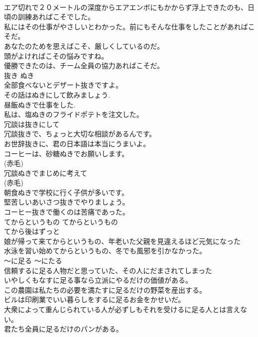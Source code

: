 \documentclass[8pt]{extreport}
\begin{document}
\begin{CJK}{UTF8}{min}
\\	エア切れで２０メートルの深度からエアエンボにもかからず浮上できたのも、日頃の訓練あればこそでした。  
\\	私にはその仕事がやさしいとわかった。前にもそんな仕事をしたことがあればこそだ。  
\\	あなたのためを思えばこそ、厳しくしているのだ。  
\\	頭がよければこその悩みですね。  
\\	優勝できたのは、チーム全員の協力あればこそだ。  
\\	抜き	ぬき	
\\	全部食べないとデザート抜きですよ。  
\\	その話はぬきにして飲みましょう.  
\\	昼飯ぬきで仕事をした.  
\\	私は、塩ぬきのフライドポテトを注文した。  
\\	冗談は抜きにして  
\\	冗談抜きで、ちょっと大切な相談があるんです。   
\\	お世辞抜きに、君の日本語は本当にうまいよ。   
\\	コーヒーは、砂糖ぬきでお願いします。  
\\	(赤毛)
\\	冗談ぬきでまじめに考えて  
\\	(赤毛)
\\	朝食ぬきで学校に行く子供が多いです。   
\\	堅苦しいあいさつ抜きでやりましょう。   
\\	コーヒー抜きで働くのは苦痛であった。   
\\	てからというもの	てからというもの	
\\	てから後はずっと	
\\	娘が帰って来てからというもの、年老いた父親を見違えるほど元気になった   
\\	水泳を習い始めてからというもの、冬でも風邪を引かなかった。   
\\	〜に足る	〜にたる	
\\	信頼するに足る人物だと思っていた、その人にだまされてしまった  
\\	いやしくもなすに足る事なら立派にやるだけの価値がある。   
\\	この農園は私たちの必要を満たすに足るだけの野菜を産出する。   
\\	ビルは印刷業でいい暮らしをするに足るお金をかせいだ。   
\\	大衆によって重んじられている人が必ずしもそれを受けるに足る人とは言えない。   
\\	君たち全員に足るだけのパンがある。   

\end{CJK}
\end{document}
